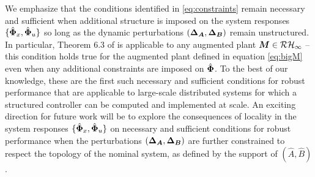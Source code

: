 We emphasize that the conditions identified in \eqref{eq:constraints} remain necessary and sufficient when additional structure is imposed on the system responses $\{\hat{\boldsymbol{\Phi}}_x,\hat{\boldsymbol{\Phi}}_u\}$ so long as the dynamic perturbations $({\boldsymbol{\Delta}}_{\boldsymbol{A}},{\boldsymbol{\Delta}}_{\boldsymbol{B}})$ remain unstructured.  In particular, Theorem 6.3 of \cite{khammash1990stability} is applicable to any augmented plant $\boldsymbol{M} \in \mathcal{RH}_\infty$ -- this condition holds true for the augmented plant defined in equation \eqref{eq:bigM} even when any additional constraints are imposed on $\hat{\boldsymbol{\Phi}}$.  To the best of our knowledge, these are the first such necessary and sufficient conditions for robust performance that are applicable to large-scale distributed systems for which a structured controller can be computed and implemented at scale.  An exciting direction for future work will be to explore the consequences of locality in the system responses $\{\hat{\boldsymbol{\Phi}}_x,\hat{\boldsymbol{\Phi}}_u\}$ on necessary and sufficient conditions for robust performance when the perturbations $({\boldsymbol{\Delta}}_{\boldsymbol{A}},{\boldsymbol{\Delta}}_{\boldsymbol{B}})$ are further constrained to respect the topology of the nominal system, as defined by the support of $(\hat A, \hat B)$.
%
